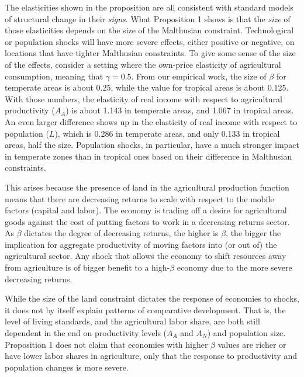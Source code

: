 \documentclass[11pt]{article}
\begin{document}
\vspace{.3cm} The elasticities shown in the proposition are all consistent with standard models of structural change \citep{kp2001,Gollin:2007oq,Restuccia:2008hc,Gollin:2010ys,vollrath2011,Alvarez-Cuadrado:2011nx,hrv2014,duarte2010role} in their \textit{signs}. What Proposition 1 shows is that the \textit{size} of those elasticities depends on the size of the Malthusian constraint. Technological or population shocks will have more severe effects, either positive or negative, on locations that have tighter Malthusian constraints. To give some sense of the size of the effects, consider a setting where the own-price elasticity of agricultural consumption, meaning that $\gamma = 0.5$. From our empirical work, the size of $\beta$ for temperate areas is about 0.25, while the value for tropical areas is about 0.125. With those numbers, the elasticity of real income with respect to agricultural productivity ($A_A$) is about 1.143 in temperate areas, and 1.067 in tropical areas. An even larger difference shows up in the elasticity of real income with respect to population ($L$), which is 0.286 in temperate areas, and only 0.133 in tropical areas, half the size. Population shocks, in particular, have a much stronger impact in temperate zones than in tropical ones based on their difference in Malthusian constraints.

This arises because the presence of land in the agricultural production function means that there are decreasing returns to scale with respect to the mobile factors (capital and labor). The economy is trading off a desire for agricultural goods against the cost of putting factors to work in a decreasing returns sector. As $\beta$ dictates the degree of decreasing returns, the higher is $\beta$, the bigger the implication for aggregate productivity of moving factors into (or out of) the agricultural sector. Any shock that allows the economy to shift resources away from agriculture is of bigger benefit to a high-$\beta$ economy due to the more severe decreasing returns. 

While the size of the land constraint dictates the response of economies to shocks, it does not by itself explain patterns of comparative development. That is, the level of living standards, and the agricultural labor share, are both still dependent in the end on productivity levels ($A_A$ and $A_N$) and population size. Proposition 1 does not claim that economies with higher $\beta$ values are richer or have lower labor shares in agriculture, only that the response to productivity and population changes is more severe.
\end{document}
